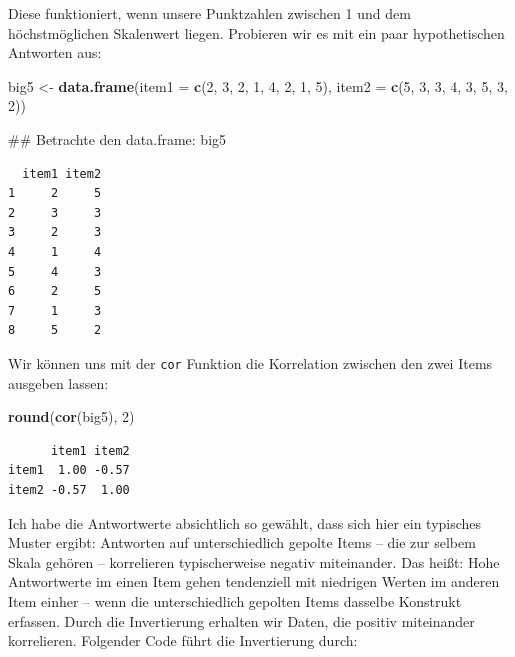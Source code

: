 \documentclass[12pt,]{tufte-book}
\newenvironment{Shaded}{\begin{snugshade}}{\end{snugshade}}
\newcommand{\KeywordTok}[1]{\textcolor[rgb]{0.13,0.29,0.53}{\textbf{#1}}}
\newcommand{\DataTypeTok}[1]{\textcolor[rgb]{0.13,0.29,0.53}{#1}}
\newcommand{\DecValTok}[1]{\textcolor[rgb]{0.00,0.00,0.81}{#1}}
\newcommand{\StringTok}[1]{\textcolor[rgb]{0.31,0.60,0.02}{#1}}
\newcommand{\NormalTok}[1]{#1}
\theoremstyle{definition}
\theoremstyle{definition}
\theoremstyle{definition}
\theoremstyle{remark}
\begin{document}
Diese funktioniert, wenn unsere Punktzahlen zwischen 1 und dem
höchstmöglichen Skalenwert liegen. Probieren wir es mit ein paar
hypothetischen Antworten aus:

\begin{Shaded}
\begin{Highlighting}[]
\NormalTok{big5 <-}\StringTok{ }\KeywordTok{data.frame}\NormalTok{(}\DataTypeTok{item1 =} \KeywordTok{c}\NormalTok{(}\DecValTok{2}\NormalTok{, }\DecValTok{3}\NormalTok{, }\DecValTok{2}\NormalTok{, }\DecValTok{1}\NormalTok{, }\DecValTok{4}\NormalTok{, }\DecValTok{2}\NormalTok{, }
    \DecValTok{1}\NormalTok{, }\DecValTok{5}\NormalTok{), }\DataTypeTok{item2 =} \KeywordTok{c}\NormalTok{(}\DecValTok{5}\NormalTok{, }\DecValTok{3}\NormalTok{, }\DecValTok{3}\NormalTok{, }\DecValTok{4}\NormalTok{, }\DecValTok{3}\NormalTok{, }\DecValTok{5}\NormalTok{, }\DecValTok{3}\NormalTok{, }\DecValTok{2}\NormalTok{))}

\NormalTok{## Betrachte den data.frame:}
\NormalTok{big5}
\end{Highlighting}
\end{Shaded}

\begin{verbatim}
  item1 item2
1     2     5
2     3     3
3     2     3
4     1     4
5     4     3
6     2     5
7     1     3
8     5     2
\end{verbatim}

Wir können uns mit der \texttt{cor} Funktion die Korrelation zwischen
den zwei Items ausgeben lassen:

\begin{Shaded}
\begin{Highlighting}[]
\KeywordTok{round}\NormalTok{(}\KeywordTok{cor}\NormalTok{(big5), }\DecValTok{2}\NormalTok{)}
\end{Highlighting}
\end{Shaded}

\begin{verbatim}
      item1 item2
item1  1.00 -0.57
item2 -0.57  1.00
\end{verbatim}

Ich habe die Antwortwerte absichtlich so gewählt, dass sich hier ein
typisches Muster ergibt: Antworten auf unterschiedlich gepolte Items --
die zur selbem Skala gehören -- korrelieren typischerweise negativ
miteinander. Das heißt: Hohe Antwortwerte im einen Item gehen
tendenziell mit niedrigen Werten im anderen Item einher -- wenn die
unterschiedlich gepolten Items dasselbe Konstrukt erfassen. Durch die
Invertierung erhalten wir Daten, die positiv miteinander korrelieren.
Folgender Code führt die Invertierung durch:
\end{document}
